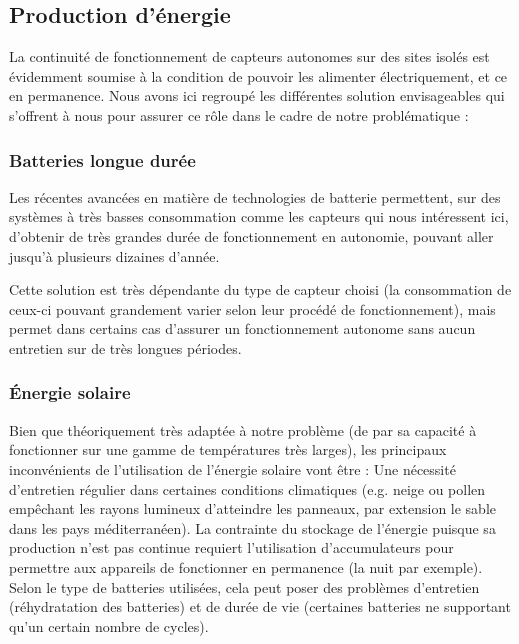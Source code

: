 \subsection{Production d'énergie}

La continuité de fonctionnement de capteurs autonomes sur des sites isolés est évidemment soumise à la condition de pouvoir les alimenter électriquement, et ce en permanence. Nous avons ici regroupé les différentes solution envisageables qui s’offrent à nous pour assurer ce rôle dans le cadre de notre problématique :

\subsubsection{Batteries longue durée}

Les récentes avancées en matière de technologies de batterie permettent, sur des systèmes à très basses consommation comme les capteurs qui nous intéressent ici, d’obtenir de très grandes durée de fonctionnement en autonomie, pouvant aller jusqu’à plusieurs dizaines d’année\footnotemark.


Cette solution est très dépendante du type de capteur choisi (la consommation de ceux-ci pouvant grandement varier selon leur procédé de fonctionnement), mais permet dans certains cas d’assurer un fonctionnement autonome sans aucun entretien sur de très longues périodes.

\subsubsection{Énergie solaire}

Bien que théoriquement très adaptée à notre problème (de par sa capacité à fonctionner sur une gamme de températures très larges), les principaux inconvénients de l’utilisation de l’énergie solaire vont être :
Une nécessité d’entretien régulier dans certaines conditions climatiques (e.g. neige ou pollen empêchant les rayons lumineux d’atteindre les panneaux, par extension le sable dans les pays méditerranéen).
La contrainte du stockage de l’énergie puisque sa production n’est pas continue requiert l’utilisation d’accumulateurs pour permettre aux appareils de fonctionner en permanence (la nuit par exemple). Selon le type de batteries utilisées, cela peut poser des problèmes d’entretien (réhydratation des batteries) et de durée de vie (certaines batteries ne supportant qu’un certain nombre de cycles).

